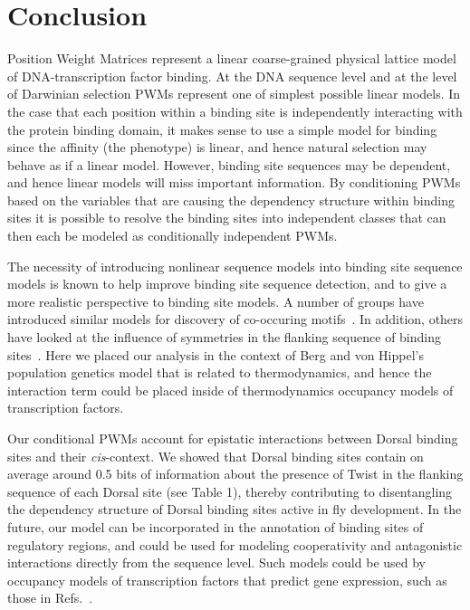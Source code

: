 \section{Conclusion}

Position Weight Matrices represent a linear coarse-grained physical lattice model of DNA-transcription factor binding.  At the DNA sequence level and at the level of Darwinian selection PWMs represent one of simplest possible linear models.  In the case that each position within a binding site is independently interacting with the protein binding domain, it makes sense to use a simple model for binding since the affinity (the phenotype) is linear, and hence natural selection may behave as if a linear model.  However, binding site sequences may be dependent, and hence linear models will miss important information.  By conditioning PWMs based on the variables that are causing the dependency structure within binding sites it is possible to resolve the binding sites into independent classes that can then each be modeled as conditionally independent PWMs.

The necessity of introducing nonlinear sequence models into binding site sequence models is known to help improve binding site sequence detection, and to give a more realistic perspective to binding site models.  A number of groups have introduced similar models for discovery of co-occuring motifs~\cite{liu2001bioprospector,pmid21486752,pmid16873468,pmid14762058,barasch,pmid18426806,pmid19286833,GuhaThakurta01072001,gadempmid19193149,Moses04phylogeneticmotif}.  In addition, others have looked at the influence of symmetries in the flanking sequence of binding sites~\cite{pmid21723826,pmid25313048}.  Here we placed our analysis in the context of Berg and von Hippel's population genetics model that is related to thermodynamics, and hence the interaction term could be placed inside of thermodynamics occupancy models of transcription factors.

Our conditional PWMs account for epistatic interactions between Dorsal binding sites and their \textit{cis}-context.  We showed that Dorsal binding sites contain on average around 0.5 bits of information about the presence of Twist in the flanking sequence of each Dorsal site (see Table 1), thereby contributing to disentangling the dependency structure of Dorsal binding sites active in fly development.  In the future, our model can be incorporated in the annotation of binding sites of regulatory regions, and could be used for modeling cooperativity and antagonistic interactions directly from the sequence level. Such models could be used by occupancy models of transcription factors that predict gene expression, such as those in Refs.~\cite{pmid20862354,pmid20087339}. 

